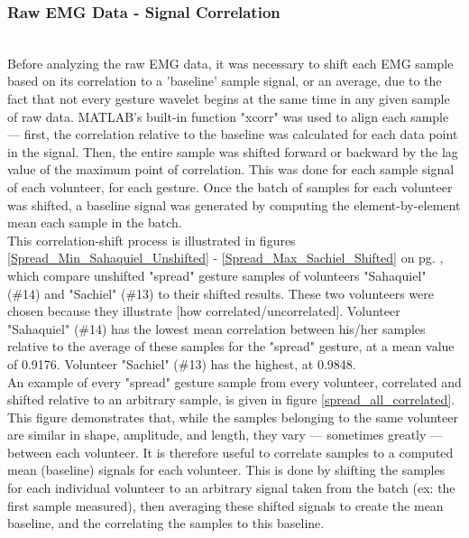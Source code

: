 \documentclass[journal]{IEEEtran}
\begin{document}
\pagebreak[4]
\newpage


\subsubsection{Raw EMG Data - Signal Correlation} \\ 
Before analyzing the raw EMG data, it was necessary to shift each EMG sample based on its correlation to a 'baseline' sample signal, or an average, due to the fact that not every gesture wavelet begins at the same time in any given sample of raw data. MATLAB's built-in function "xcorr" was used to align each sample --- first, the correlation relative to the baseline was calculated for each data point in the signal. Then, the entire sample was shifted forward or backward by the lag value of the maximum point of correlation. This was done for each sample signal of each volunteer, for each gesture. Once the batch of samples for each volunteer was shifted, a baseline signal was generated by computing the element-by-element mean each sample in the batch. \\
This correlation-shift process is illustrated in figures \ref{Spread_Min_Sahaquiel_Unshifted} - \ref{Spread_Max_Sachiel_Shifted} on pg. \pageref{Spread_Min_Sahaquiel_Unshifted}, which compare unshifted "spread" gesture samples of volunteers "Sahaquiel" (\#14) and "Sachiel" (\#13)  to their shifted results. These two volunteers were chosen because they illustrate [how correlated/uncorrelated]. Volunteer "Sahaquiel" (\#14) has the lowest mean correlation between his/her samples relative to the average of these samples for the "spread" gesture, at a mean value of 0.9176. Volunteer "Sachiel" (\#13) has the highest, at 0.9848. \\
   An example of every "spread" gesture sample from every volunteer, correlated and shifted relative to an arbitrary sample, is given in figure \ref{spread_all_correlated}. This figure demonstrates that, while the samples belonging to the same volunteer are similar in shape, amplitude, and length, they vary --- sometimes greatly --- between each volunteer. It is therefore useful to correlate samples to a computed mean (baseline) signals for each volunteer. This is done by shifting the samples for each individual volunteer to an arbitrary signal taken from the batch (ex: the first sample measured), then averaging these shifted signals to create the mean baseline, and the correlating the samples to this baseline.
    
\end{document}
